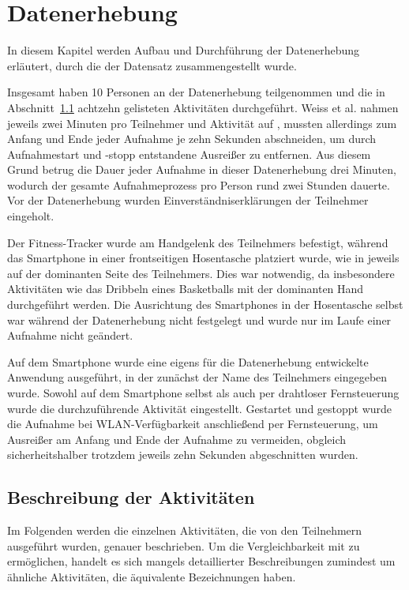 \chapter{Datenerhebung}
\label{chap:experiment}
In diesem Kapitel werden Aufbau und Durchführung der Datenerhebung erläutert, durch die der Datensatz zusammengestellt wurde.

Insgesamt haben 10 Personen an der Datenerhebung teilgenommen und die in Abschnitt~\ref{sec:activities} achtzehn gelisteten Aktivitäten durchgeführt. Weiss et al. nahmen jeweils zwei Minuten pro Teilnehmer und Aktivität auf \cite{Weiss2016}, mussten allerdings zum Anfang und Ende jeder Aufnahme je zehn Sekunden abschneiden, um durch Aufnahmestart und -stopp entstandene Ausreißer zu entfernen. Aus diesem Grund betrug die Dauer jeder Aufnahme in dieser Datenerhebung drei Minuten, wodurch der gesamte Aufnahmeprozess pro Person rund zwei Stunden dauerte. Vor der Datenerhebung wurden Einverständniserklärungen der Teilnehmer eingeholt.

Der Fitness-Tracker wurde am Handgelenk des Teilnehmers befestigt, während das Smartphone in einer frontseitigen Hosentasche platziert wurde, wie in \cite{Weiss2016} jeweils auf der dominanten Seite des Teilnehmers. Dies war notwendig, da insbesondere Aktivitäten wie das Dribbeln eines Basketballs mit der dominanten Hand durchgeführt werden. Die Ausrichtung des Smartphones in der Hosentasche selbst war während der Datenerhebung nicht festgelegt und wurde nur im Laufe einer Aufnahme nicht geändert.

Auf dem Smartphone wurde eine eigens für die Datenerhebung entwickelte Anwendung ausgeführt, in der zunächst der Name des Teilnehmers eingegeben wurde. Sowohl auf dem Smartphone selbst als auch per drahtloser Fernsteuerung wurde die durchzuführende Aktivität eingestellt. Gestartet und gestoppt wurde die Aufnahme bei WLAN-Verfügbarkeit anschließend per Fernsteuerung, um Ausreißer am Anfang und Ende der Aufnahme zu vermeiden, obgleich sicherheitshalber trotzdem jeweils zehn Sekunden abgeschnitten wurden.

\section{Beschreibung der Aktivitäten}
\label{sec:activities}
Im Folgenden werden die einzelnen Aktivitäten, die von den Teilnehmern ausgeführt wurden, genauer beschrieben. Um die Vergleichbarkeit mit \cite{Weiss2016} zu ermöglichen, handelt es sich mangels detaillierter Beschreibungen zumindest um ähnliche Aktivitäten, die äquivalente Bezeichnungen haben.

